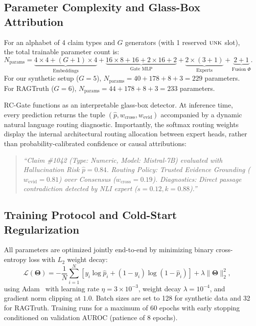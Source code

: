 \documentclass[pdflatex,sn-mathphys,Numbered]{sn-jnl}
\begin{document}
\subsection{Parameter Complexity and Glass-Box Attribution}\label{subsec:glass_box}

For an alphabet of 4 claim types and $G$ generators (with 1 reserved $\textsc{unk}$ slot), the total trainable parameter count is:
\begin{equation}
N_{\mathrm{params}} = \underbrace{4 \times 4 + (G + 1) \times 4}_{\text{Embeddings}} + \underbrace{16 \times 8 + 16 + 2 \times 16 + 2}_{\text{Gate MLP}} + \underbrace{2 \times (3 + 1)}_{\text{Experts}} + \underbrace{2 + 1}_{\text{Fusion } \Phi}.
\end{equation}
For our synthetic setup ($G=5$), $N_{\mathrm{params}} = 40 + 178 + 8 + 3 = 229$ parameters. For RAGTruth ($G=6$), $N_{\mathrm{params}} = 44 + 178 + 8 + 3 = 233$ parameters.

RC-Gate functions as an interpretable glass-box detector. At inference time, every prediction returns the tuple $(\hat{p}, w_{\mathrm{cross}}, w_{\mathrm{evid}})$ accompanied by a dynamic natural language routing diagnostic. Importantly, the softmax routing weights display the internal architectural routing allocation between expert heads, rather than probability-calibrated confidence or causal attributions:
\begin{quote}
\emph{``Claim \#1042 (Type: Numeric, Model: Mistral-7B) evaluated with Hallucination Risk $\hat{p} = 0.84$. Routing Policy: Trusted Evidence Grounding ($w_{\mathrm{evid}} = 0.81$) over Consensus ($w_{\mathrm{cross}} = 0.19$). Diagnostics: Direct passage contradiction detected by NLI expert ($s=0.12, k=0.88$).''}
\end{quote}

\subsection{Training Protocol and Cold-Start Regularization}\label{subsec:training}

All parameters are optimized jointly end-to-end by minimizing binary cross-entropy loss with $L_2$ weight decay:
\begin{equation}
\mathcal{L}(\boldsymbol{\Theta}) = -\frac{1}{N}\sum_{i=1}^N \left[ y_i \log \hat{p}_i + (1 - y_i) \log(1 - \hat{p}_i) \right] + \lambda \|\boldsymbol{\Theta}\|_2^2,
\end{equation}
using Adam~\cite{kingma2015adam} with learning rate $\eta = 3 \times 10^{-3}$, weight decay $\lambda = 10^{-4}$, and gradient norm clipping at $1.0$. Batch sizes are set to 128 for synthetic data and 32 for RAGTruth. Training runs for a maximum of 60 epochs with early stopping conditioned on validation AUROC (patience of 8 epochs).
\end{document}
